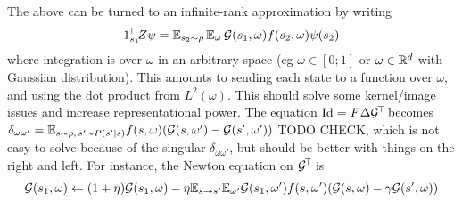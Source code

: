 \documentclass[11pt,a4paper]{article}
\newcommand{\green}{\mathcal{G}}
\begin{document}
The above can be turned to an infinite-rank approximation by writing
\begin{equation}
\transp{1_{s_1}}Z\psi=\E_{s_2\sim \rho}\, \E_{\omega}\,
\green(s_1,\omega)f(s_2,\omega)\psi(s_2)
\end{equation}
where integration is over $\omega$ in an arbitrary space (eg $\omega\in
[0;1]$ or $\omega\in {\mathbb{R}}^d$ with Gaussian distribution). This amounts to
sending each state to a function over $\omega$, and using the dot product
from $L^2(\omega)$. This should solve some kernel/image issues and
increase representational power. The equation
$\Id=F\Delta\transp{\green}$ becomes $\delta_{\omega\omega'}=\E_{s\sim
\rho, \,s'\sim P(s'|s)}
f(s,\omega)(\green(s,\omega')-\green(s',\omega'))$ TODO CHECK, which is not easy to
solve because of the singular $\delta_{\omega\omega'}$, but should be
better with things on the right and left. For instance, the Newton equation on
$\transp{\green}$ is
\begin{equation}
\green(s_1,\omega)\gets
(1+\eta)\green(s_1,\omega)-\eta\E_{s\to s'}\E_{\omega'}
\green(s_1,\omega')f(s,\omega')(\green(s,\omega)-\gamma
\green(s',\omega))
\end{equation}
\end{document}
